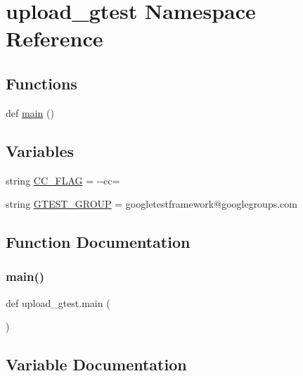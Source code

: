 \hypertarget{namespaceupload__gtest}{}\section{upload\+\_\+gtest Namespace Reference}
\label{namespaceupload__gtest}
\subsection*{Functions}
\begin{DoxyCompactItemize}
\item 
def \hyperlink{namespaceupload__gtest_ab5bef7b968c54c632a52c1b4a3d37bdd}{main} ()
\end{DoxyCompactItemize}
\subsection*{Variables}
\begin{DoxyCompactItemize}
\item 
string \hyperlink{namespaceupload__gtest_a83f0946f9ee3731253fc622acd581fc2}{C\+C\+\_\+\+F\+L\+AG} = \textquotesingle{}-\/-\/cc=\textquotesingle{}
\item 
string \hyperlink{namespaceupload__gtest_af282f4c60bf6069ed0abf4e06d9b70ab}{G\+T\+E\+S\+T\+\_\+\+G\+R\+O\+UP} = \textquotesingle{}googletestframework@googlegroups.\+com\textquotesingle{}
\end{DoxyCompactItemize}


\subsection{Function Documentation}
\mbox{\label{namespaceupload__gtest_ab5bef7b968c54c632a52c1b4a3d37bdd}} 
\subsubsection{\texorpdfstring{main()}{main()}}
{\footnotesize\ttfamily def upload\+\_\+gtest.\+main (\begin{DoxyParamCaption}{ }\end{DoxyParamCaption})}



\subsection{Variable Documentation}
\mbox{\label{namespaceupload__gtest_a83f0946f9ee3731253fc622acd581fc2}} 
